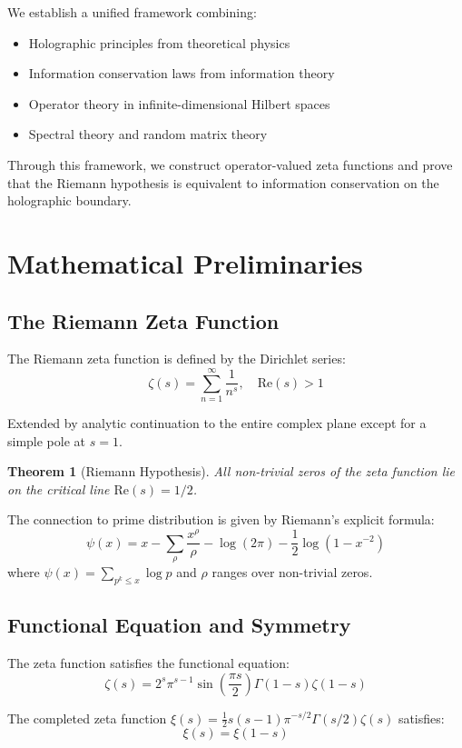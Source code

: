 \documentclass[12pt]{article}
\newtheorem{theorem}{Theorem}[section]
\begin{document}
We establish a unified framework combining:
\begin{itemize}
\item Holographic principles from theoretical physics
\item Information conservation laws from information theory
\item Operator theory in infinite-dimensional Hilbert spaces
\item Spectral theory and random matrix theory
\end{itemize}

Through this framework, we construct operator-valued zeta functions and prove that the Riemann hypothesis is equivalent to information conservation on the holographic boundary.

\section{Mathematical Preliminaries}

\subsection{The Riemann Zeta Function}

The Riemann zeta function is defined by the Dirichlet series:
$$\zeta(s) = \sum_{n=1}^{\infty} \frac{1}{n^s}, \quad \text{Re}(s) > 1$$

Extended by analytic continuation to the entire complex plane except for a simple pole at $s=1$.

\begin{theorem}[Riemann Hypothesis]
All non-trivial zeros of the zeta function lie on the critical line $\text{Re}(s) = 1/2$.
\end{theorem}

The connection to prime distribution is given by Riemann's explicit formula:
$$\psi(x) = x - \sum_{\rho} \frac{x^{\rho}}{\rho} - \log(2\pi) - \frac{1}{2}\log(1-x^{-2})$$
where $\psi(x) = \sum_{p^k \leq x} \log p$ and $\rho$ ranges over non-trivial zeros.

\subsection{Functional Equation and Symmetry}

The zeta function satisfies the functional equation:
$$\zeta(s) = 2^s \pi^{s-1} \sin\left(\frac{\pi s}{2}\right) \Gamma(1-s) \zeta(1-s)$$

The completed zeta function $\xi(s) = \frac{1}{2}s(s-1)\pi^{-s/2}\Gamma(s/2)\zeta(s)$ satisfies:
$$\xi(s) = \xi(1-s)$$
\end{document}
